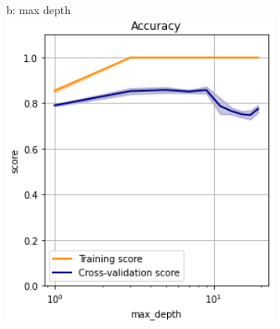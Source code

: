 \documentclass{article}
\begin{document}
\begin{figure}
\begin{subfigure}{.19\textwidth}
	\end{subfigure}
	\begin{subfigure}{.19\textwidth}
		\centering
		b: max depth\\
		\includegraphics[width=\linewidth]{poland_xgb_max_depth_accuracy.png}
		

\end{subfigure}
\end{figure}
\end{document}
